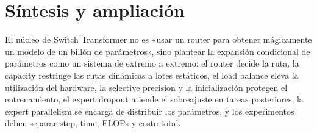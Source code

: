 \section{Síntesis y ampliación}

El núcleo de Switch Transformer no es «usar un router para obtener mágicamente un modelo de un billón de parámetros», sino plantear la expansión condicional de parámetros como un sistema de extremo a extremo: el router decide la ruta, la capacity restringe las rutas dinámicas a lotes estáticos, el load balance eleva la utilización del hardware, la selective precision y la inicialización protegen el entrenamiento, el expert dropout atiende el sobreajuste en tareas posteriores, la expert parallelism se encarga de distribuir los parámetros, y los experimentos deben separar step, time, FLOPs y costo total.

